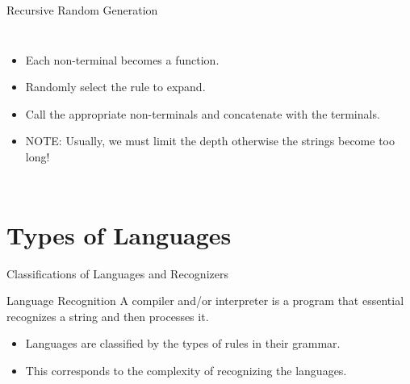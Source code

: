 \documentclass[]{beamer}
\newenvironment{code}{%
 \VerbatimEnvironment
 \begin{adjustbox}{max width=\textwidth, max height=0.7\textheight}
 \begin{BVerbatim}
  }{
  \end{BVerbatim}
 \end{adjustbox}
}
\begin{document}
\begin{frame}[fragile]{Recursive Random Generation}
\begin{columns}

    \begin{itemize}
        \item Each non-terminal becomes a function.
        \item Randomly select the rule to expand.
        \item Call the appropriate non-terminals and concatenate with the terminals.
        \item NOTE: Usually, we must limit the depth otherwise the strings become too long!
    \end{itemize}
    \end{columns}
\end{frame}

\section{Types of Languages}
\begin{frame}{Classifications of Languages and Recognizers}
    \begin{block}{Language Recognition}
        A compiler and/or interpreter is a program that essential recognizes a 
        string and then processes it.
    \end{block}
    \begin{itemize}
        \item Languages are classified by the types of rules in their grammar.
        \item This corresponds to the complexity of recognizing the languages.
    \end{itemize}
\end{frame}
\end{document}
